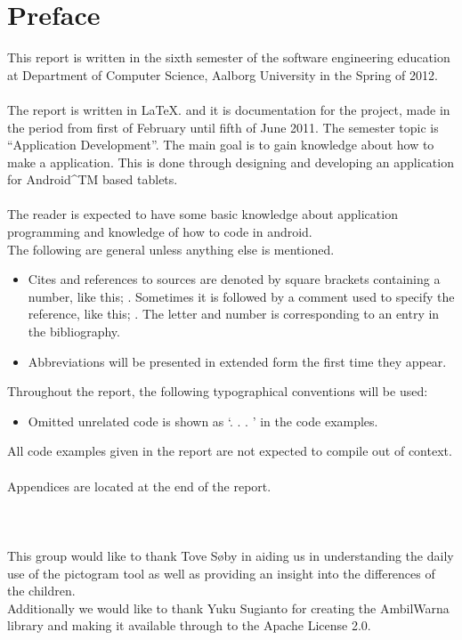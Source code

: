 \chapter*{Preface}
This report is written in the sixth semester of the software engineering education at Department of Computer Science, Aalborg University in the Spring of 2012.  \\
\\
The report is written in \LaTeX. and it is documentation for the project, made in the period from first of February until fifth of June 2011.
The semester topic is ``Application Development''. The main goal is to gain knowledge about how to make a application. This is done through designing and developing an application for Android^{TM} based tablets.\\
\\
The reader is expected to have some basic knowledge about application programming and knowledge of how to code in android. \\
The following are general unless anything else is mentioned.

\begin{itemize}
\item Cites and references to sources are denoted by square brackets containing a number,  like this; \cite{XP}. Sometimes it is followed by a comment used to specify the reference, like this; \cite[Comment]{XP}. The letter and number is corresponding to an entry in the bibliography. 
\item Abbreviations will be presented in extended form the first time they appear. 
\end{itemize}

Throughout the report, the following typographical conventions will be used:
 
\begin{itemize}
\item Omitted unrelated code is shown as `. . . ’ in the code examples.
\end{itemize}

All code examples given in the report are not expected to compile out of context.\\
\\
Appendices are located at the end of the report. \\ \\  \\ \\

This group would like to thank Tove S\o{}by in aiding us in understanding the daily use of the pictogram tool as well as providing an insight into the differences of the children.\\
Additionally we would like to thank Yuku Sugianto for creating the AmbilWarna library and making it available through to the Apache License 2.0. \cite{ambilw} 

